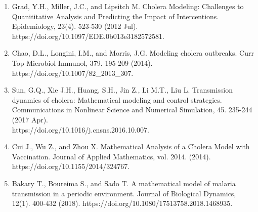\documentclass[letter,12pt, usenames,dvipsnames]{article}
\newcommand{\underscore}{\_}
\begin{document}
\begin{enumerate}
\item Grad, Y.H., Miller, J.C., and Lipsitch M. Cholera Modeling: Challenges to Quanititative Analysis and Predicting the Impact of Intercentions. Epidemiology, 23(4). 523-530 (2012 Jul). https://doi.org/10.1097/EDE.0b013e3182572581. \\
\item Chao, D.L., Longini, I.M., and Morris, J.G. Modeling cholera outbreaks. Curr Top Microbiol Immunol, 379. 195-209 (2014). https://doi.org/10.1007/82\underscore2013\underscore307. \\
\item Sun, G.Q., Xie J.H., Huang, S.H., Jin Z., Li M.T., Liu L. Transmission dynamics of cholera: Mathematical modeling and control strategies. Communications in Nonlinear Science and Numerical Simulation, 45. 235-244 (2017 Apr).\\ https://doi.org/10.1016/j.cnsns.2016.10.007. \\
\item Cui J., Wu Z., and Zhou X. Mathematical Analysis of a Cholera Model with Vaccination. Journal of Applied Mathematics, vol. 2014. (2014).\\ https://doi.org/10.1155/2014/324767. \\
\item Bakary T., Boureima S., and Sado T. A mathematical model of malaria transmission in a periodic environment. Journal of Biological Dynamics, 12(1). 400-432 (2018). https://doi.org/10.1080/17513758.2018.1468935. \\
\end{enumerate}
\end{document}
